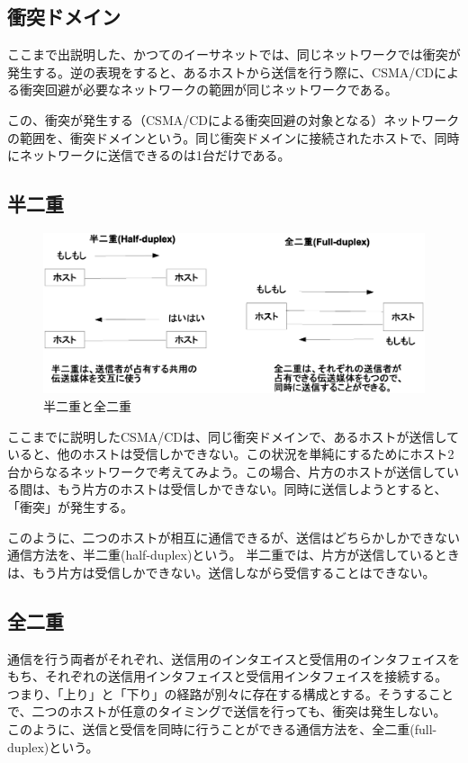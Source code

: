\subsection{衝突ドメイン}

ここまで出説明した、かつてのイーサネットでは、同じネットワークでは衝突が発生する。逆の表現をすると、あるホストから送信を行う際に、CSMA/CDによる衝突回避が必要なネットワークの範囲が同じネットワークである。

この、衝突が発生する（CSMA/CDによる衝突回避の対象となる）ネットワークの範囲を、衝突ドメインという。同じ衝突ドメインに接続されたホストで、同時にネットワークに送信できるのは1台だけである。


\subsection{半二重}

\begin{figure}[htbp]
	\includegraphics[width=12cm,clip]{draw/duplex.eps}
	\caption{半二重と全二重}
	\label{fig:duplex}
\end{figure}

ここまでに説明したCSMA/CDは、同じ衝突ドメインで、あるホストが送信していると、他のホストは受信しかできない。この状況を単純にするためにホスト2台からなるネットワークで考えてみよう。この場合、片方のホストが送信している間は、もう片方のホストは受信しかできない。同時に送信しようとすると、「衝突」が発生する。

このように、二つのホストが相互に通信できるが、送信はどちらかしかできない通信方法を、半二重(half-duplex)という。
半二重では、片方が送信しているときは、もう片方は受信しかできない。送信しながら受信することはできない。

\subsection{全二重}

通信を行う両者がそれぞれ、送信用のインタエイスと受信用のインタフェイスをもち、それぞれの送信用インタフェイスと受信用インタフェイスを接続する。
つまり、「上り」と「下り」の経路が別々に存在する構成とする。そうすることで、二つのホストが任意のタイミングで送信を行っても、衝突は発生しない。
このように、送信と受信を同時に行うことができる通信方法を、全二重(full-duplex)という。

